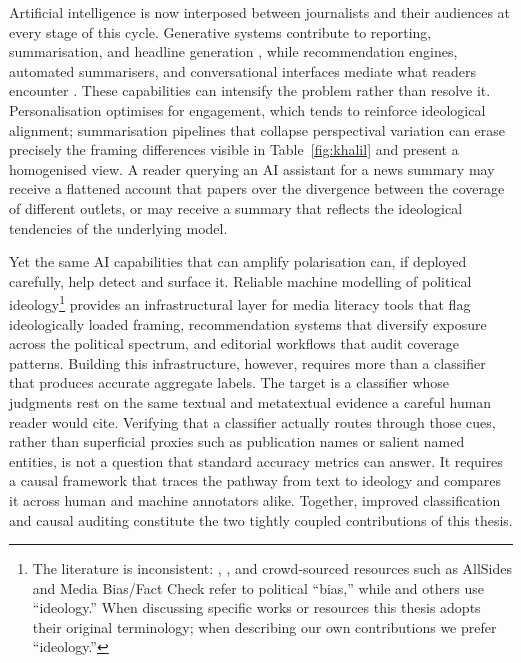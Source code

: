 Artificial intelligence is now interposed between journalists and their audiences at every stage of this cycle. Generative systems contribute to reporting, summarisation, and headline generation \citep{al2024artificial, sonnie2025digital}, while recommendation engines, automated summarisers, and conversational interfaces mediate what readers encounter \citep{Rydenfelt19022026, Kiskola_2025}. These capabilities can intensify the problem rather than resolve it. Personalisation optimises for engagement, which tends to reinforce ideological alignment; summarisation pipelines that collapse perspectival variation can erase precisely the framing differences visible in Table~\ref{fig:khalil} and present a homogenised view. A reader querying an AI assistant for a news summary may receive a flattened account that papers over the divergence between the coverage of different outlets, or may receive a summary that reflects the ideological tendencies of the underlying model.

Yet the same AI capabilities that can amplify polarisation can, if deployed carefully, help detect and surface it. Reliable machine modelling of political ideology\footnote{The literature is inconsistent: \citet{ronnback2025biasoutlets}, \citet{baly2020we}, and crowd-sourced resources such as AllSides and Media Bias/Fact Check refer to political ``bias,'' while \citet{liu2022politics} and others use ``ideology.'' When discussing specific works or resources this thesis adopts their original terminology; when describing our own contributions we prefer ``ideology.''} provides an infrastructural layer for media literacy tools that flag ideologically loaded framing, recommendation systems that diversify exposure across the political spectrum, and editorial workflows that audit coverage patterns. Building this infrastructure, however, requires more than a classifier that produces accurate aggregate labels. The target is a classifier whose judgments rest on the same textual and metatextual evidence a careful human reader would cite. Verifying that a classifier actually routes through those cues, rather than superficial proxies such as publication names or salient named entities, is not a question that standard accuracy metrics can answer. It requires a causal framework that traces the pathway from text to ideology and compares it across human and machine annotators alike. Together, improved classification and causal auditing constitute the two tightly coupled contributions of this thesis.
